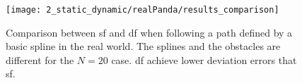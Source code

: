 \begin{figure}[ht]
    \centering
    \texttt{[image: 2\_static\_dynamic/realPanda/results\_comparison]}
    \caption{Comparison between \ac{sf} and \ac{df} when following a path defined
      by a basic spline in the real world. 
      The splines and the obstacles are different for the $N=20$ case.
      \ac{df} achieve lower deviation errors that \ac{sf}.
    }%
    \label{fig:experiment2_realPanda_res}
\end{figure}



